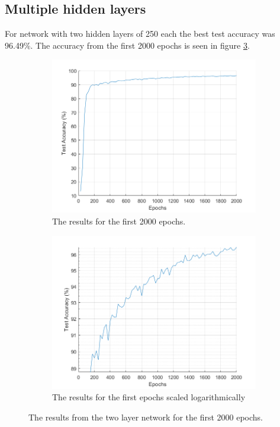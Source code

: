 \documentclass[12pt]{article}
\begin{document}
	\subsection{Multiple hidden layers}
	For network with two hidden layers of 250 each the best test accuracy was 96.49\%. The accuracy from the first 2000 epochs is seen in figure \ref{fig:250_all_l2}. 
		\begin{figure}
		\centering
		\begin{subfigure}{.5\textwidth}
			\centering
			\includegraphics[width=\linewidth]{250_results_l2}
			\caption{The results for the first 2000 epochs.}
			\label{fig:250results_l2}
		\end{subfigure}%
		\begin{subfigure}{.5\textwidth}
			\centering
			\includegraphics[width=\linewidth]{250_results_log_l2}
			\caption{The results for the first epochs scaled logarithmically}
			\label{fig:250resultslog_l2}
		\end{subfigure}
		\caption{The results from the two layer network for the first 2000 epochs.}
		\label{fig:250_all_l2}
	\end{figure}
\end{document}
